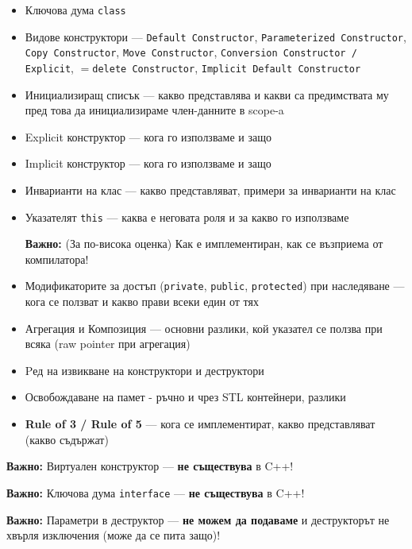 \documentclass[a4paper,11pt]{article}
\newcommand{\nope}[1]{%
  \begin{tcolorbox}[warningbox]
    \faExclamationTriangle\quad\textbf{\color{warning}Важно:} #1
  \end{tcolorbox}%
}
\newcommand{\qtag}[1]{\texttt{\color{greenaccent}\small#1}}
\begin{document}
\begin{tcolorbox}[categorybox, title={2.\ Класове и конструктори}]
\begin{itemize}
\item Ключова дума \qtag{class}
  \item Видове конструктори — \qtag{Default Constructor}, \qtag{Parameterized Constructor}, \qtag{Copy Constructor}, \qtag{Move Constructor}, \qtag{Conversion Constructor / Explicit}, \qtag{$=$delete Constructor}, \qtag{Implicit Default Constructor}
  \item Инициализиращ списък — какво представлява и какви са предимствата му пред това да инициализираме член-данните в scope-a
  \item Explicit конструктор — кога го използваме и защо
  \item Implicit конструктор — кога го използваме и защо
  \item Инварианти на клас — какво представляват, примери за инварианти на клас
  \item Указателят \qtag{this} — каква е неговата роля и за какво го използваме
  \nope{(За по-висока оценка) Как е имплементиран, как се възприема от компилатора!}
  \item Модификаторите за достъп (\qtag{private}, \qtag{public}, \qtag{protected}) при наследяване — кога се ползват и какво прави всеки един от тях
  \item Агрегация и Композиция — основни разлики, кой указател се ползва при всяка (raw pointer при агрегация)
  \item Pед на извикване на конструктори и деструктори
  \item Освобождаване на памет - ръчно и чрез STL контейнери, разлики
  \item \textbf{Rule of 3 / Rule of 5} — кога се имплементират, какво представляват (какво съдържат)
\end{itemize}

\nope{Виртуален конструктор — \textbf{не съществува} в C++!}
\nope{Ключова дума \texttt{interface} — \textbf{не съществува} в C++!}
\nope{Параметри в деструктор — \textbf{не можем да подаваме} и деструкторът не хвърля изключения (може да се пита защо)!}
\end{tcolorbox}
\end{document}
